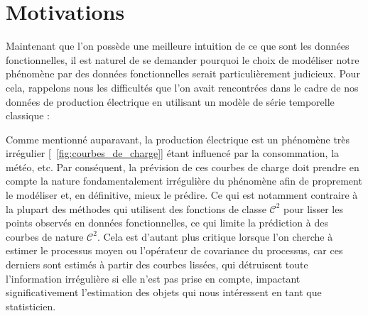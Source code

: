 \chapter{Motivations}
\minitoc%



\smallskip



\bigskip

\noindent
{}

\pagebreak



\pagebreak



\pagebreak


Maintenant que l'on possède une meilleure intuition de ce que sont les données fonctionnelles, il est naturel de se demander pourquoi le choix de modéliser notre phénomène par des données fonctionnelles serait particulièrement judicieux. Pour cela, rappelons nous les difficultés que l'on avait rencontrées dans le cadre de nos données de production électrique en utilisant un modèle de série temporelle classique :




Comme mentionné auparavant, la production électrique est un phénomène très irrégulier [~\ref{fig:courbes_de_charge}] étant influencé par la consommation, la météo, etc. Par conséquent, la prévision de ces courbes de charge doit prendre en compte la nature fondamentalement irrégulière du phénomène afin de proprement le modéliser et, en définitive, mieux le prédire. Ce qui est notamment contraire à la plupart des méthodes qui utilisent des fonctions de classe $\mathcal C^2$ pour lisser les points observés en données fonctionnelles, ce qui limite la prédiction à des courbes de nature $\mathcal C^2$. Cela est d'autant plus critique lorsque l'on cherche à estimer le processus moyen ou l'opérateur de covariance du processus, car ces derniers sont estimés à partir des courbes lissées, qui détruisent toute l'information irrégulière si elle n'est pas prise en compte, impactant significativement l'estimation des objets qui nous intéressent en tant que statisticien.

